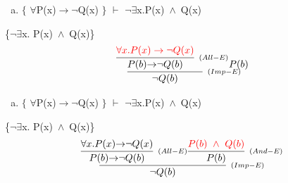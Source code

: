 \documentclass[aspectratio=43]{beamer}
\newcommand{\ria}{$\rightarrow$}
\newcommand{\fall}{$\forall$}
\newcommand{\ex}{$\exists$}
\newcommand{\nao}{$\neg$}
\newcommand{\nex}{\nao\ex}
\newcommand{\andd}{$\wedge$}
\begin{document}
    \begin{frame}[fragile]
    	
    	\begin{enumerate}[b)]
			
			\item $\{$ \fall P(x)\ria \nao Q(x) $\}$ $\vdash$ \nex  x.P(x)\ \andd\ Q(x) \\ 
			
		\end{enumerate}
        \{\nex  x. P(x)\ \andd\ Q(x)\}
        \vspace{90pt}
        \[
        \begin{array}{c}
		
        	\infer[_{(Imp-E)}]
            {$\nao$ Q(b)}
            {\infer[_{(All-E)}] 
            	{P(b) $\ria$ $\nao$ Q(b)}
               	{\textcolor{red}{\forall x.P(x)\rightarrow \neg Q(x)}} 
            P(b)
            }
		\end{array}
        \]
        
	\end{frame}
    
    \begin{frame}[fragile]
    	
    	\begin{enumerate}[b)]
			
			\item $\{$ \fall P(x)\ria \nao Q(x) $\}$ $\vdash$ \nex  x.P(x)\ \andd\ Q(x) \\ 
			
		\end{enumerate}
        \{\nex  x. P(x)\ \andd\ Q(x)\}
        \vspace{90pt}
        \[
        \begin{array}{c}
		
        	\infer[_{(Imp-E)}]
            {$\nao$ Q(b)}
            {\infer[_{(All-E)}] 
            	{P(b) $\ria$ $\nao$ Q(b)}
               	{$\fall$x.P(x)$\ria$ $\nao$ Q(x)} 
            \infer[_{(And-E)}] 
                {P(b)} 
                {\textcolor{red}{P(b)\ \wedge\ Q(b)}}
            }
		\end{array}
        \]
        
	\end{frame}
    
\end{document}
